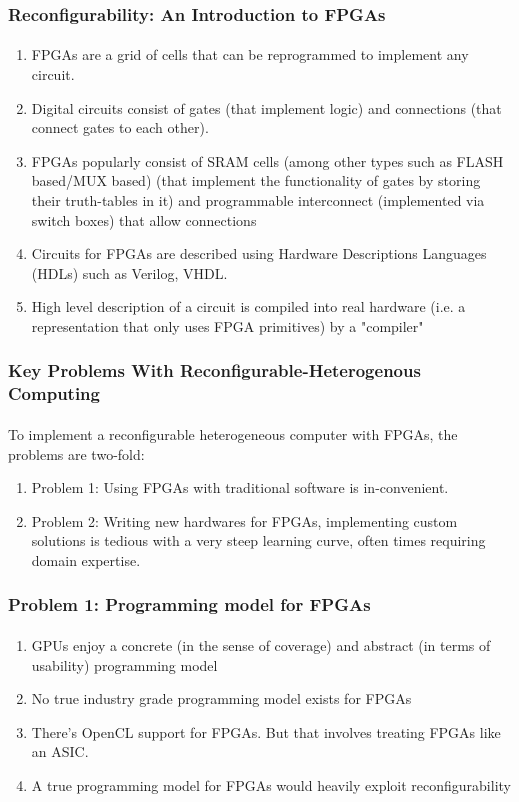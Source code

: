\documentclass{beamer}
\begin{document}
{\begin{frame}[fragile]
\frametitle{Reconfigurability: An Introduction to FPGAs}
\framesubtitle{}
  \begin{enumerate}
    \item FPGAs are a grid of cells that can be reprogrammed to implement
      any circuit. 
    \item Digital circuits consist of gates (that implement logic) and
      connections (that connect gates to each other).
    \item FPGAs popularly consist of SRAM cells (among other types such as FLASH based/MUX
      based) (that implement the
      functionality of gates by storing their truth-tables in it) and
      programmable interconnect (implemented via switch boxes) that allow
      connections
    \item Circuits for FPGAs are described using Hardware Descriptions Languages
      (HDLs) such as Verilog, VHDL.
    \item High level description of a circuit is compiled into real hardware
      (i.e. a representation that only uses FPGA primitives) by a "compiler"
  \end{enumerate}

\end{frame}

\begin{frame}[fragile]
\frametitle{Key Problems With Reconfigurable-Heterogenous Computing}
\framesubtitle{}
    To implement a reconfigurable heterogeneous computer with FPGAs,
      the problems are two-fold:
  \begin{enumerate}
    \item Problem 1: Using FPGAs with traditional software is in-convenient.
    \item Problem 2: Writing new hardwares for FPGAs, implementing custom solutions is
      tedious with a very steep learning curve, often times requiring 
      domain expertise.
  \end{enumerate}
\end{frame}

\begin{frame}[fragile]
\frametitle{Problem 1: Programming model for FPGAs}
\framesubtitle{}
  \begin{enumerate}
    \item GPUs enjoy a concrete (in the sense of coverage) and abstract (in
      terms of usability) programming model
    \item No true industry grade programming model exists for FPGAs
    \item There's OpenCL support for FPGAs. But that involves treating
      FPGAs like an ASIC.
    \item A true programming model for FPGAs would heavily exploit
      reconfigurability
  \end{enumerate}
\end{frame}

}
\end{document}
